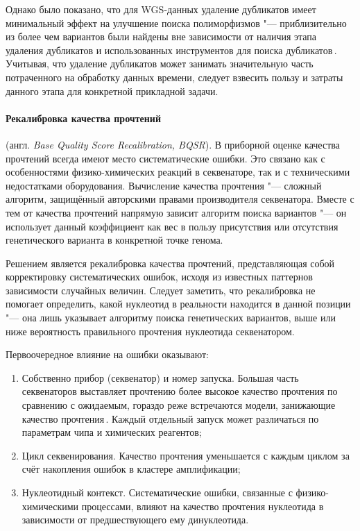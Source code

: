 \documentclass[a4paper,14pt]{extarticle}
\newcommand{\mln}{млн}
\newcommand{\ecitep}[1]{\textenglish{\citep{#1}}}
\newcommand{\engterm}[1]{англ. \textenglish{\textit{#1}}}
\begin{document}
Однако было показано, что для WGS-данных удаление дубликатов имеет минимальный эффект на улучшение поиска полиморфизмов "--- приблизительно  из более чем \numprint[\mln]{17} вариантов были найдены вне зависимости от наличия этапа удаления дубликатов и использованных инструментов для поиска дубликатов\,\ecitep{Ebbert_2016}.
Учитывая, что удаление дубликатов может занимать значительную часть потраченного на обработку данных времени, следует взвесить пользу и затраты данного этапа для конкретной прикладной задачи.

\paragraph{Рекалибровка качества прочтений} (\engterm{Base Quality Score Recalibration, BQSR}).
В приборной оценке качества прочтений всегда имеют место систематические ошибки.
Это связано как с особенностями физико-химических реакций в секвенаторе, так и с техническими недостатками оборудования.
Вычисление качества прочтения "--- сложный алгоритм, защищённый авторскими правами производителя секвенатора.
Вместе с тем от качества прочтений напрямую зависит алгоритм поиска вариантов "--- он использует данный коэффициент как вес в пользу присутствия или отсутствия генетического варианта в конкретной точке генома.

Решением является рекалибровка качества прочтений, представляющая собой корректировку систематических ошибок, исходя из известных паттернов зависимости случайных величин.
Следует заметить, что рекалибровка не помогает определить, какой нуклеотид в реальности находится в данной позиции "--- она лишь указывает алгоритму поиска генетических вариантов, выше или ниже вероятность правильного прочтения нуклеотида секвенатором.

Первоочередное влияние на ошибки оказывают:

\begin{enumerate}
	\item Собственно прибор (секвенатор) и номер запуска.
	 Большая часть секвенаторов выставляет прочтению более высокое качество прочтения по сравнению с ожидаемым, гораздо реже встречаются модели, занижающие качество прочтения\,\ecitep{Auwera_2013}.
	 Каждый отдельный запуск может различаться по параметрам чипа и химических реагентов;
	\item Цикл секвенирования.
	 Качество прочтения уменьшается с каждым циклом за счёт накопления ошибок в кластере амплификации;
	\item Нуклеотидный контекст.
	 Систематические ошибки, связанные с физико-химическими процессами, влияют на качество прочтения нуклеотида в зависимости от предшествующего ему динуклеотида.
\end{enumerate}
\end{document}
